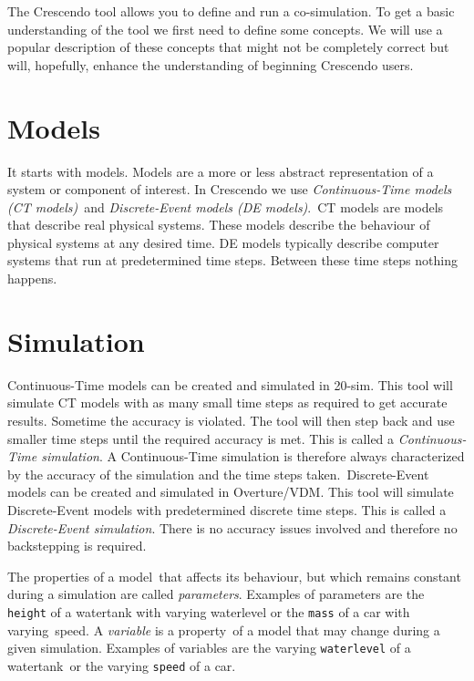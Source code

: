\documentclass{crescendorepchap}
\begin{document}
The Crescendo tool allows you to define and run a co-simulation. To get a
basic understanding of the tool we first need to define some concepts.
We will use a popular description of these concepts that might not
be completely correct but will, hopefully, enhance the understanding of
beginning Crescendo users.

\section{Models}

It starts with models. Models are a more or less abstract representation
of a system or component of interest. In Crescendo we use
\emph{Continuous-Time models (CT models)}~and \emph{Discrete-Event
models (DE models)}.~CT models are models that describe
real physical systems. These models describe the behaviour of physical
systems at any desired time. DE models typically describe
computer systems that run at predetermined time steps. Between these
time steps nothing happens.

\section{Simulation}

Continuous-Time models can be created and simulated in 20-sim. This tool
will simulate CT models with as many small time steps as
required to get accurate results. Sometime the accuracy is violated. The
tool will then step back and use smaller time steps until the required
accuracy is met. This is called a \emph{Continuous-Time simulation}. A
Continuous-Time simulation is therefore always characterized by the
accuracy of the simulation and the time steps taken.~Discrete-Event
models can be created and simulated in Overture/VDM. This tool will simulate
Discrete-Event models with predetermined discrete time steps. This is
called a \emph{Discrete-Event simulation}. There is no accuracy issues
involved and therefore no backstepping is required.

The properties of a model~that affects its behaviour, but which remains
constant during a simulation are called \emph{parameters}. Examples of
parameters are the \texttt{height} of a watertank with varying waterlevel or
the \texttt{mass} of a car with varying~speed. A \emph{variable} is a
property~of a model that may change during a given simulation. Examples
of variables are the varying \texttt{waterlevel} of a watertank~or the
varying \texttt{speed} of a car.
\end{document}
